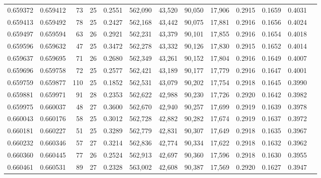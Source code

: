 \begin{tabular}{rrrrrrrrrrrrr}
0.659372 & 0.659412 &  73 &  25 &                                     0.2551 & 562,090 &  43,520 &  90,050 &  17,906 & 0.2915 & 0.1659 & 0.4031 \\
0.659413 & 0.659492 &  78 &  25 &                                     0.2427 & 562,168 &  43,442 &  90,075 &  17,881 & 0.2916 & 0.1656 & 0.4024 \\
0.659497 & 0.659594 &  63 &  26 &                                     0.2921 & 562,231 &  43,379 &  90,101 &  17,855 & 0.2916 & 0.1654 & 0.4018 \\
0.659596 & 0.659632 &  47 &  25 &                                     0.3472 & 562,278 &  43,332 &  90,126 &  17,830 & 0.2915 & 0.1652 & 0.4014 \\
0.659637 & 0.659695 &  71 &  26 &                                     0.2680 & 562,349 &  43,261 &  90,152 &  17,804 & 0.2916 & 0.1649 & 0.4007 \\
0.659696 & 0.659758 &  72 &  25 &                                     0.2577 & 562,421 &  43,189 &  90,177 &  17,779 & 0.2916 & 0.1647 & 0.4001 \\
0.659759 & 0.659877 & 110 &  25 &                                     0.1852 & 562,531 &  43,079 &  90,202 &  17,754 & 0.2918 & 0.1645 & 0.3990 \\
0.659881 & 0.659971 &  91 &  28 &                                     0.2353 & 562,622 &  42,988 &  90,230 &  17,726 & 0.2920 & 0.1642 & 0.3982 \\
0.659975 & 0.660037 &  48 &  27 &                                     0.3600 & 562,670 &  42,940 &  90,257 &  17,699 & 0.2919 & 0.1639 & 0.3978 \\
0.660043 & 0.660176 &  58 &  25 &                                     0.3012 & 562,728 &  42,882 &  90,282 &  17,674 & 0.2919 & 0.1637 & 0.3972 \\
0.660181 & 0.660227 &  51 &  25 &                                     0.3289 & 562,779 &  42,831 &  90,307 &  17,649 & 0.2918 & 0.1635 & 0.3967 \\
0.660232 & 0.660346 &  57 &  27 &                                     0.3214 & 562,836 &  42,774 &  90,334 &  17,622 & 0.2918 & 0.1632 & 0.3962 \\
0.660360 & 0.660445 &  77 &  26 &                                     0.2524 & 562,913 &  42,697 &  90,360 &  17,596 & 0.2918 & 0.1630 & 0.3955 \\
0.660461 & 0.660531 &  89 &  27 &                                     0.2328 & 563,002 &  42,608 &  90,387 &  17,569 & 0.2920 & 0.1627 & 0.3947 \\

\end{tabular}
